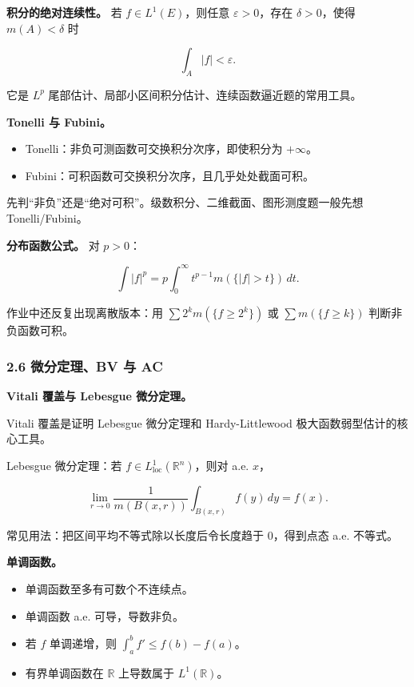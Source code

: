 \documentclass[
UTF8]{ctexart}
\providecommand{\tightlist}{%
\setlength{\itemsep}{0pt}\setlength{\parskip}{0pt}}
\begin{document}
\textbf{积分的绝对连续性。} 若 \(f\in L^1(E)\)，则任意
\(\varepsilon>0\)，存在 \(\delta>0\)，使得 \(m(A)<\delta\) 时

\[
  \int_A |f|<\varepsilon.
\]

它是 \(L^p\) 尾部估计、局部小区间积分估计、连续函数逼近题的常用工具。

\textbf{Tonelli 与 Fubini。}

\begin{itemize}
    \tightlist
  \item
    Tonelli：非负可测函数可交换积分次序，即使积分为 \(+\infty\)。
  \item
    Fubini：可积函数可交换积分次序，且几乎处处截面可积。
\end{itemize}

先判``非负''还是``绝对可积''。级数积分、二维截面、图形测度题一般先想
Tonelli/Fubini。

\textbf{分布函数公式。} 对 \(p>0\)：

\[
  \int |f|^p
  =p\int_0^\infty t^{p-1}m(\{|f|>t\})\,dt.
\]

作业中还反复出现离散版本：用 \(\sum 2^k m(\{f\ge2^k\})\) 或
\(\sum m(\{f\ge k\})\) 判断非负函数可积。

\subsubsection{2.6 微分定理、BV 与
AC}\label{ux5faeux5206ux5b9aux7406bv-ux4e0e-ac}

\textbf{Vitali 覆盖与 Lebesgue 微分定理。}

Vitali 覆盖是证明 Lebesgue 微分定理和 Hardy-Littlewood
极大函数弱型估计的核心工具。

Lebesgue 微分定理：若 \(f\in L^1_{\mathrm{loc}}(\mathbb R^n)\)，则对
a.e. \(x\)，

\[
  \lim_{r\to0}\frac{1}{m(B(x,r))}\int_{B(x,r)} f(y)\,dy=f(x).
\]

常见用法：把区间平均不等式除以长度后令长度趋于 \(0\)，得到点态 a.e.
不等式。

\textbf{单调函数。}

\begin{itemize}
    \tightlist
  \item
    单调函数至多有可数个不连续点。
  \item
    单调函数 a.e. 可导，导数非负。
  \item
    若 \(f\) 单调递增，则 \(\int_a^b f'\le f(b)-f(a)\)。
  \item
    有界单调函数在 \(\mathbb R\) 上导数属于 \(L^1(\mathbb R)\)。
\end{itemize}
\end{document}
